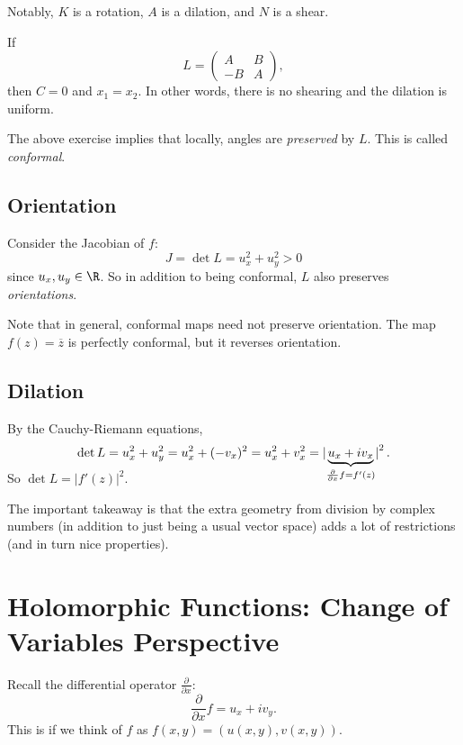 Notably, $K$ is a rotation, $A$ is a dilation, and $N$
is a shear.

\begin{tcolorbox}[title=Exercise]
  If
  \[
  L =
  \left(\begin{matrix}
      A & B \\
      -B & A
  \end{matrix}\right)
  ,\]
  then $C = 0$ and $x_1 = x_2$. In other words, there
  is no shearing and the dilation is uniform.
\end{tcolorbox}

The above exercise implies that locally, angles are
\textit{preserved} by $L$. This is called
\textit{conformal}.

\subsection{Orientation}
Consider the Jacobian of $f$:
\[
J = \det L = u_x^2 + u_y^2 > 0
\]
since $u_x, u_y \in \R$. So in addition to being
conformal, $L$ also preserves \textit{orientations}.

Note that in general, conformal maps need not preserve
orientation. The map $f(z) = \overline{z}$ is perfectly
conformal, but it reverses orientation.

\subsection{Dilation}
By the Cauchy-Riemann equations,
\[
\det L = u_x^2 + u_y^2 = u_x^2 + (-v_x)^2
= u_x^2 + v_x^2 = \left\lvert\smash[b]{\underbrace{u_x + iv_x}_{\frac{\partial}{\partial x} f = f'(z)}}\right\rvert^2
.\]
So $\det L = |f'(z)|^2$.

The important takeaway is that the extra geometry from
division by complex numbers (in addition to just being a
usual vector space) adds a lot of restrictions (and
in turn nice properties).

\section{Holomorphic Functions: Change of Variables Perspective}
Recall the differential operator
$\frac{\partial}{\partial x}$:
\[
\frac{\partial}{\partial x} f = u_x + iv_y
.\]
This is if we think of $f$ as
$f(x, y) = (u(x, y), v(x, y))$.

